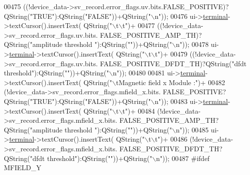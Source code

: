 \begin{DoxyCode}
00475                                             ((!device\_data->sv\_record.error\_flags.uv.bits.FALSE\_POSITIVE)?
      QString(\textcolor{stringliteral}{"TRUE"}):QString(\textcolor{stringliteral}{"FALSE"}))+QString(\textcolor{stringliteral}{"\(\backslash\)n"}));
00476        ui->\hyperlink{a00080_aae71c46ea4546df5994735dee573b2dd}{terminal}->textCursor().insertText( QString(\textcolor{stringliteral}{"\(\backslash\)t\(\backslash\)t"})+
00477                                             ((!device\_data->sv\_record.error\_flags.uv.bits.
      FALSE\_POSITIVE\_AMP\_TH)?QString(\textcolor{stringliteral}{"amplitude threshold "}):QString(\textcolor{stringliteral}{""}))+QString(\textcolor{stringliteral}{"\(\backslash\)n"}));
00478        ui->\hyperlink{a00080_aae71c46ea4546df5994735dee573b2dd}{terminal}->textCursor().insertText( QString(\textcolor{stringliteral}{"\(\backslash\)t\(\backslash\)t"})+
00479                                             ((!device\_data->sv\_record.error\_flags.uv.bits.
      FALSE\_POSITIVE\_DFDT\_TH)?QString(\textcolor{stringliteral}{"dfdt threshold"}):QString(\textcolor{stringliteral}{""}))+QString(\textcolor{stringliteral}{"\(\backslash\)n"}));
00480 
00481        ui->\hyperlink{a00080_aae71c46ea4546df5994735dee573b2dd}{terminal}->textCursor().insertText( QString(\textcolor{stringliteral}{"\(\backslash\)tMagnetic field x Module :"})+
00482                                             (!device\_data->sv\_record.error\_flags.mfield\_x.bits.
      FALSE\_POSITIVE?QString(\textcolor{stringliteral}{"TRUE"}):QString(\textcolor{stringliteral}{"FALSE"}))+QString(\textcolor{stringliteral}{"\(\backslash\)n"}));
00483        ui->\hyperlink{a00080_aae71c46ea4546df5994735dee573b2dd}{terminal}->textCursor().insertText( QString(\textcolor{stringliteral}{"\(\backslash\)t\(\backslash\)t"})+
00484                                             (!device\_data->sv\_record.error\_flags.mfield\_x.bits.
      FALSE\_POSITIVE\_AMP\_TH?QString(\textcolor{stringliteral}{"amplitude threshold "}):QString(\textcolor{stringliteral}{""}))+QString(\textcolor{stringliteral}{"\(\backslash\)n"}));
00485        ui->\hyperlink{a00080_aae71c46ea4546df5994735dee573b2dd}{terminal}->textCursor().insertText( QString(\textcolor{stringliteral}{"\(\backslash\)t\(\backslash\)t"})+
00486                                             (!device\_data->sv\_record.error\_flags.mfield\_x.bits.
      FALSE\_POSITIVE\_DFDT\_TH?QString(\textcolor{stringliteral}{"dfdt threshold"}):QString(\textcolor{stringliteral}{""}))+QString(\textcolor{stringliteral}{"\(\backslash\)n"}));
00487 \textcolor{preprocessor}{#ifdef MFIELD\_Y}

\end{DoxyCode}
